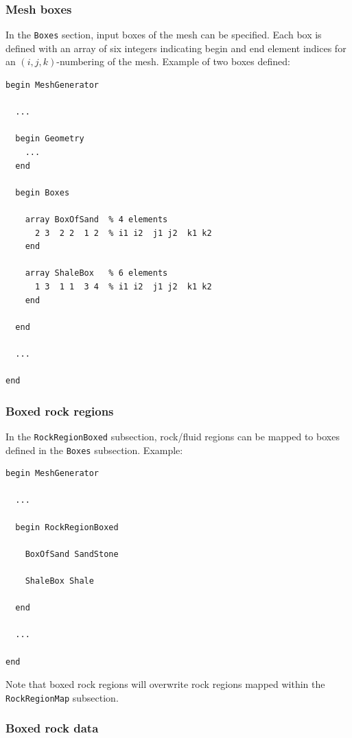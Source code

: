 \subsubsection{Mesh boxes}
\label{sec:mesh boxes}

In the \texttt{Boxes} section, input boxes of the mesh can be
specified. Each box is defined with an array of six integers
indicating begin and end element indices for an $(i,j,k)$-numbering of
the mesh. Example of two boxes defined:
%
\begin{verbatim}
begin MeshGenerator

  ... 

  begin Geometry
    ... 
  end

  begin Boxes

    array BoxOfSand  % 4 elements
      2 3  2 2  1 2  % i1 i2  j1 j2  k1 k2
    end

    array ShaleBox   % 6 elements
      1 3  1 1  3 4  % i1 i2  j1 j2  k1 k2
    end

  end

  ... 

end
\end{verbatim}
%


\subsubsection{Boxed rock regions}
\label{sec:boxed-rock-regions}

In the \texttt{RockRegionBoxed} subsection, rock/fluid regions can be
mapped to boxes defined in the \texttt{Boxes} subsection. Example:
%
\begin{verbatim}
begin MeshGenerator

  ... 

  begin RockRegionBoxed
  
    BoxOfSand SandStone
    
    ShaleBox Shale
    
  end

  ... 

end
\end{verbatim}
%
Note that boxed rock regions will overwrite rock regions mapped within
the \texttt{RockRegionMap} subsection. 

\subsubsection{Boxed rock data}
\label{sec:boxed-rock-data}

